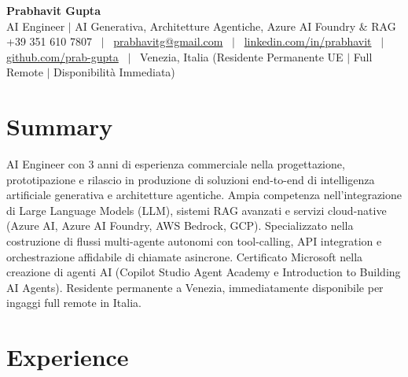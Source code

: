 \documentclass[a4paper,10pt]{article}
\begin{document}
\begin{minipage}[c]{0.80\textwidth}
  {\Huge\bfseries Prabhavit Gupta}\\[3pt]
  {\color{accent}\large AI Engineer $\vert$ AI Generativa, Architetture Agentiche, Azure AI Foundry $\&$ RAG}\\[6pt]
  {\footnotesize +39 351 610 7807 ~$\vert$~
  \href{mailto:prabhavitg@gmail.com}{prabhavitg@gmail.com} ~$\vert$~
  \href{https://www.linkedin.com/in/prabhavit/}{linkedin.com/in/prabhavit} ~$\vert$~
  \href{https://github.com/prab-gupta}{github.com/prab-gupta} ~$\vert$~
  Venezia, Italia (Residente Permanente UE $\vert$ Full Remote $\vert$ Disponibilità Immediata)}
\end{minipage}\hfill

\section{Summary}
AI Engineer con 3 anni di esperienza commerciale nella progettazione, prototipazione e rilascio in produzione di soluzioni end-to-end di intelligenza artificiale generativa e architetture agentiche. Ampia competenza nell'integrazione di Large Language Models (LLM), sistemi RAG avanzati e servizi cloud-native (Azure AI, Azure AI Foundry, AWS Bedrock, GCP). Specializzato nella costruzione di flussi multi-agente autonomi con tool-calling, API integration e orchestrazione affidabile di chiamate asincrone. Certificato Microsoft nella creazione di agenti AI (Copilot Studio Agent Academy e Introduction to Building AI Agents). Residente permanente a Venezia, immediatamente disponibile per ingaggi full remote in Italia.

\section{Experience}
\end{document}
